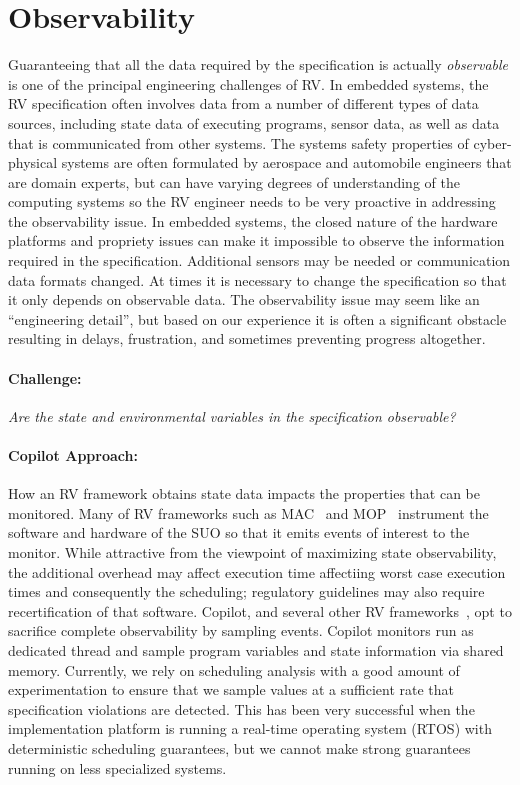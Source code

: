 \section{Observability}\label{sec:observ} 
Guaranteeing that all the data required by the specification is
actually \emph{observable} is one of the principal engineering
challenges of RV. In embedded systems, the RV specification often
involves data from a number of different types of data sources,
including state data of executing programs, sensor data, as well as
data that is communicated from other systems.  The systems safety
properties of cyber-physical systems are often formulated by aerospace
and automobile engineers that are domain experts, but can have
varying degrees of understanding of the computing systems so the RV
engineer needs to be very proactive in addressing the observability
issue. In embedded systems, the closed nature of the hardware
platforms and propriety issues can make it impossible to observe the
information required in the specification.  Additional sensors may be
needed or communication data formats changed.  At times it is
necessary to change the specification so that it only depends on
observable data.  The observability issue may seem like an
``engineering detail'', but based on our experience it is often a
significant obstacle resulting in  delays, frustration, and sometimes
preventing progress altogether.


\paragraph{Challenge:} \emph{Are the state and environmental variables in the
specification  observable?}  


  \paragraph{Copilot Approach:} How an RV framework obtains state data impacts the properties that
  can be monitored. Many of RV frameworks such as MAC~\cite{KimLKS04}
  and MOP~\cite{ChenR05} instrument the software and hardware of the
  SUO so that it emits events of interest to the monitor.  While
  attractive from the viewpoint of maximizing state observability, the
  additional overhead may affect execution time affectiing worst case
  execution times and consequently the scheduling; 
  regulatory guidelines may  also require recertification of that software.
  Copilot, and several other RV frameworks~\cite{sampling,Kane15,borzoo}, opt to sacrifice complete
  observability by sampling events.  Copilot monitors run as dedicated
  thread and sample program variables and state information via shared
  memory.  Currently, we rely on scheduling analysis with a good
  amount of experimentation to ensure that we sample values at a
  sufficient rate that specification violations are detected. This has
  been very successful when the implementation platform is running a
  real-time operating system (RTOS) with deterministic scheduling
  guarantees, but we cannot make strong guarantees running on less
  specialized systems.

